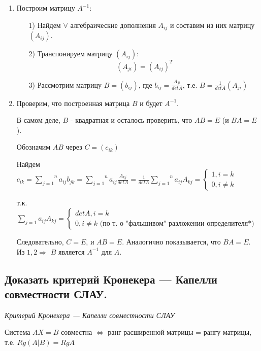 \begin{enumerate}
    \item Построим матрицу $A^{-1}:$
    \begin{enumerate}
        \item[1)] Найдем $\forall$ алгебраические дополнения $A_{ij}$ и составим из них матрицу $(A_{ij})$.
        \item[2)] Транспонируем матрицу $(A_{ij}):$
    $$(A_{ji}) = (A_{ij})^T$$
        \item[3)] Рассмотрим матрицу $B = (b_{ij})$, где $b_{ij} = \frac{A_{ji}}{detA}$, т.е. $B = \frac{1}{detA}(A_{ji})$
    \end{enumerate}
    \item Проверим, что построенная матрица $B$ и будет $A^{-1}$.

    В самом деле, $B$ - квадратная и осталось проверить, что $AB = E$ (и $BA = E$).

    Обозначим $AB$ через $C = (c_{ik})$

    Найдем $c_{ik} = \overset{n}{\underset{j = 1}{\sum}}a_{ij}b_{jk} = \overset{n}{\underset{j = 1}{\sum}}a_{ij}\frac{A_{kj}}{detA} = \frac{1}{detA}\overset{n}{\underset{j = 1}{\sum}}a_{ij}A_{kj} = \begin{cases}1, i = k\\ 0, i \ne k\end{cases}$ 
    
    т.к. ${\underset{j = 1}{\sum}}a_{ij}A_{kj} = \begin{cases}detA, i = k\\ 0, i \ne k \text{ (по т. о "фальшивом"\ разложении определителя*)}\end{cases}$

    Следовательно, $C = E$, и $AB = E$.
    Аналогично показывается, что $BA = E$.
    Из $1, 2 \Rightarrow$ $B$ является $A^{-1}$ для $A$.

\end{enumerate}

\ep

\subsection{Доказать критерий Кронекера — Капелли совместности СЛАУ.}
\textit{Критерий Кронекера — Капелли совместности СЛАУ}

\vspace*{15pt}

Система $AX = B$ совместна $\iff$ ранг расширенной матрицы = рангу матрицы, т.е. $Rg(A|B) = RgA$

